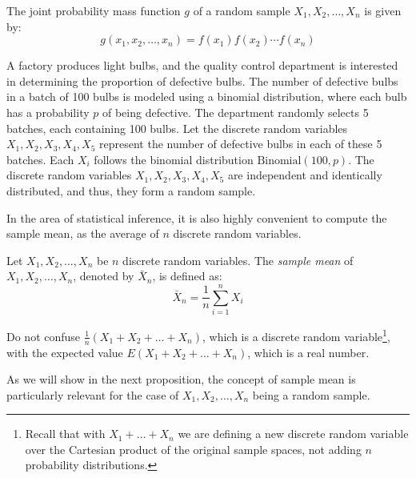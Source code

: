 The joint probability mass function \( g \) of a random sample \( X_1, X_2, \ldots, X_n \) is given by:
\[
g\left( x_1, x_2, \ldots, x_n \right) = f\left( x_1 \right) f\left( x_2 \right) \cdots f\left( x_n \right)
\]

\begin{example}
A factory produces light bulbs, and the quality control department is interested in determining the proportion of defective bulbs. The number of defective bulbs in a batch of 100 bulbs is modeled using a binomial distribution, where each bulb has a probability \( p \) of being defective. The department randomly selects 5 batches, each containing 100 bulbs. Let the discrete random variables \( X_1, X_2, X_3, X_4, X_5 \) represent the number of defective bulbs in each of these 5 batches. Each \( X_i \) follows the binomial distribution \( \text{Binomial}(100, p) \). The discrete random variables \( X_1, X_2, X_3, X_4, X_5 \) are independent and identically distributed, and thus, they form a random sample.
\end{example}

In the area of statistical inference, it is also highly convenient to compute the sample mean, as the average of \( n \) discrete random variables.

\begin{definition}
Let \( X_1, X_2, \ldots, X_n \) be \( n \) discrete random variables. The \emph{sample mean} of \( X_1, X_2, \ldots, X_n \), denoted by \( \bar{X}_n \), is defined as:
\[
\bar{X}_n = \frac{1}{n} \sum_{i=1}^n X_i
\]
\end{definition}

Do not confuse \( \frac{1}{n} \left( X_1 + X_2 + \ldots + X_n \right) \), which is a discrete random variable\footnote{Recall that with \( X_1 + \ldots + X_n \) we are defining a new discrete random variable over the Cartesian product of the original sample spaces, not adding \( n \) probability distributions.}, with the expected value \( E\left( X_1 + X_2 + \ldots + X_n \right) \), which is a real number.

As we will show in the next proposition, the concept of sample mean is particularly relevant for the case of \( X_1, X_2, \ldots, X_n \) being a random sample.

